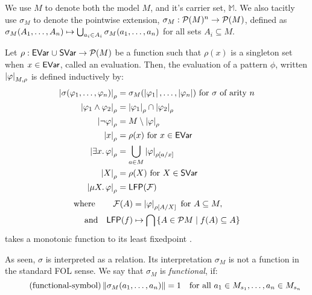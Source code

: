 We use \(M\) to denote both the model \(M\), and it's carrier set, \(\mathbb M\).
We also tacitly use \(\sigma_M\) to denote the pointwise extension, \(\sigma_M : \mathcal P(M)^n \to \mathcal P(M)\),
defined as \(\sigma_M(A_1,\dots,A_n) \mapsto \bigcup_{a_i\in A_i} \sigma_M(a_1,\dots,a_n)\)
for all sets \(A_i \subseteq M\).

\begin{definition}\label{def:semantics}Let \(\rho : \mathsf{EVar}{} \mathrel{\cup} \mathsf{SVar}{} \to \mathcal P(M)\) be a function such that \(\rho(x)\) is a singleton set when \(x \in \mathsf{EVar}\),
called an evaluation.
Then, the evaluation of a pattern \(\phi\), written \(\left| {\varphi} \right|_{M,\rho}\) is defined inductively by:
\begin{align*}
\left| {\sigma(\varphi_1, \ldots, \varphi_n)} \right|_\rho &= \sigma_M(\left| {\varphi_1} \right|, \ldots, \left| {\varphi_n} \right|) \text{ for $\sigma$ of arity $n$} \\
\left| {\varphi_1 \land \varphi_2} \right|_\rho            &= \left| {\varphi_1} \right|_\rho \cap \left| {\varphi_2} \right|_\rho \\
\left| {\lnot \varphi} \right|_\rho                     &= M\setminus \left| {\varphi} \right|_\rho \\ 
\left| {x} \right|_\rho                              &= \rho(x) \text{ for } x \in \mathsf{EVar} \\
\left| {\exists x \ldotp \varphi} \right|_\rho          &= \bigcup_{a \in M}  \left| {\varphi} \right|_{\rho[a/x]}\\
\left| {X} \right|_\rho                              &= \rho(X) \text{ for } X \in \mathsf{SVar}  \\
\left| {\mu X \ldotp \varphi} \right|_\rho              &= \mathsf{LFP}(\mathcal{F})
\end{align*}
\begin{align*}
\text{where }&&
    \mathcal{F}(A) &= \left| {\varphi} \right|_{\rho[A/X]} \text{ for } A \subseteq M, \\
\text{and} &&
    \mathsf{LFP}(f) &\mapsto \bigcap\left\{A \in \mathcal P{M} \mid f(A) \subseteq A \right\}
\end{align*}
takes a monotonic function to its least fixedpoint \cite{matching-mu-logic}.\end{definition}

As seen, \(\sigma\) is interpreted as a relation.
Its interpretation \(\sigma_M\) is not a function in the standard FOL sense.
We say that \(\sigma_M\) is \emph{functional}, if:
\begin{equation}\tag{functional-symbol}
\label{eq:functional-symbol}
\left\lVert \sigma_M(a_1,\dots,a_n)\right\rVert = 1  \quad \text{for all $a_1 \in  M_{s_1}, \dots, a_n \in M_{s_n}$}
\end{equation}

